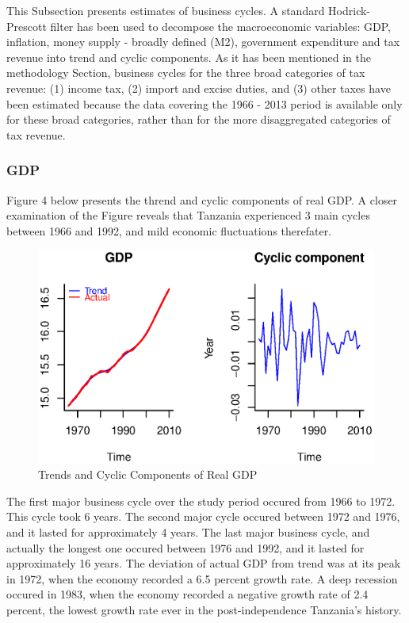 \documentclass[12pt,a4paper,final]{article}
\begin{document}
This Subsection presents estimates of business cycles. A standard Hodrick-Prescott filter has been used to decompose the macroeconomic variables: GDP, inflation,  money supply - broadly defined (M2), government expenditure and tax revenue into trend and cyclic components. As it has been mentioned in the methodology Section, business cycles for the three broad categories of tax revenue: (1) income tax, (2) import and excise duties, and (3) other taxes have been estimated because the data covering the 1966 - 2013 period is available only for these broad categories, rather than for the more disaggregated categories of tax revenue.

\subsubsection{GDP}

Figure 4 below presents the thrend and cyclic components of real GDP. A closer examination of the Figure reveals that Tanzania experienced 3 main cycles between 1966 and 1992, and mild economic fluctuations therefater. 

\begin{figure}[ht]
\centering
\begin{small}
\caption{Trends and Cyclic Components of Real GDP}
\end{small}
\includegraphics[scale=0.601]{gap_comp.eps} 
\end{figure}

The first major business cycle over the study period occured from 1966 to 1972.  This cycle took 6 years.  The second major cycle occured between 1972 and 1976, and it lasted for approximately 4 years. The last major business cycle, and actually the longest one occured between 1976 and 1992, and it lasted for approximately 16 years. The deviation of actual GDP from trend was at its peak in 1972, when the economy recorded a 6.5 percent growth rate. A deep recession occured in 1983, when the economy recorded a negative growth rate of 2.4 percent, the lowest growth rate ever in the post-independence Tanzania's history.
\end{document}
